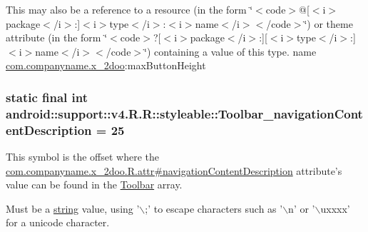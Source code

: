 This may also be a reference to a resource (in the form \char`\"{}$<$code$>$@\mbox{[}$<$i$>$package$<$/i$>$:\mbox{]}$<$i$>$type$<$/i$>$:$<$i$>$name$<$/i$>$$<$/code$>$\char`\"{}) or theme attribute (in the form \char`\"{}$<$code$>$?\mbox{[}$<$i$>$package$<$/i$>$:\mbox{]}\mbox{[}$<$i$>$type$<$/i$>$:\mbox{]}$<$i$>$name$<$/i$>$$<$/code$>$\char`\"{}) containing a value of this type.  name \hyperlink{namespacecom_1_1companyname_1_1x__2doo}{com.companyname.x\_\-2doo}:maxButtonHeight \hypertarget{classandroid_1_1support_1_1v4_1_1_r_1_1styleable_18960c8315e8816542d771ce838c8551}{
\subsubsection[{Toolbar\_\-navigationContentDescription}]{\setlength{\rightskip}{0pt plus 5cm}static final int android::support::v4.R.R::styleable::Toolbar\_\-navigationContentDescription = 25}}
\label{classandroid_1_1support_1_1v4_1_1_r_1_1styleable_18960c8315e8816542d771ce838c8551}


This symbol is the offset where the \hyperlink{classcom_1_1companyname_1_1x__2doo_1_1_r_1_1attr_f7bc08d807cfbde758e79f125fda972a}{com.companyname.x\_\-2doo.R.attr\#navigationContentDescription} attribute's value can be found in the \hyperlink{classandroid_1_1support_1_1v4_1_1_r_1_1styleable_0646d71cfbd4a8645c7d805b33e1c574}{Toolbar} array.

Must be a \hyperlink{classandroid_1_1support_1_1v4_1_1_r_1_1string}{string} value, using '$\backslash$;' to escape characters such as '$\backslash$n' or '$\backslash$uxxxx' for a unicode character. 

